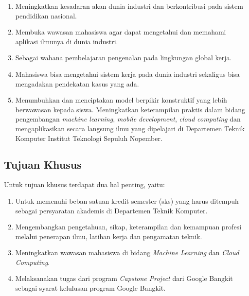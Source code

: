     \begin{enumerate}[nolistsep]

      \item Meningkatkan kesadaran akan dunia industri dan berkontribusi pada sistem pendidikan nasional.

      \item Membuka wawasan mahasiswa agar dapat mengetahui dan memahami aplikasi ilmunya di dunia industri.

      \item Sebagai wahana pembelajaran pengenalan pada lingkungan global kerja.

      \item Mahasiswa bisa mengetahui sistem kerja pada dunia industri sekaligus bisa mengadakan pendekatan kasus yang ada.

      \item Menumbuhkan dan menciptakan model berpikir konstruktif yang lebih berwawasan kepada siswa. Meningkatkan keterampilan praktis dalam bidang pengembangan \textit{machine learning}, \textit{mobile development}, \textit{cloud computing} dan mengaplikasikan secara langsung ilmu yang dipelajari di Departemen Teknik Komputer Institut Teknologi Sepuluh Nopember.

    \end{enumerate}

  \subsection{Tujuan Khusus}
  Untuk tujuan khusus terdapat dua hal penting, yaitu:

    \begin{enumerate}[nolistsep]
      
      \item Untuk memenuhi beban satuan kredit semester (sks) yang harus ditempuh sebagai persyaratan akademis di Departemen Teknik Komputer.

      \item Mengembangkan pengetahuan, sikap, keterampilan dan kemampuan profesi melalui penerapan ilmu, latihan kerja dan pengamatan teknik.

      \item Meningkatkan wawasan mahasiswa di bidang \textit{Machine Learning} dan \textit{Cloud Computing}.

      \item Melaksanakan tugas dari program \textit{Capstone Project} dari Google Bangkit sebagai syarat kelulusan program Google Bangkit.

    \end{enumerate}

